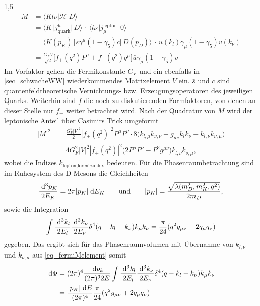 \documentclass[11pt,a4paper,twoside]{report}
\begin{document}
\begin{spacing}{1,5}
\begin{align}
 M &= \big\langle Kl\nu|\mathcal{H}|D\big\rangle\nonumber\\
 &= \big\langle K\, \big|j_\text{quark}^\mu\big|\,D \big\rangle \,\cdot\,\big\langle l\nu\,\big|j_\mu^\text{lepton}\big|\,0\big\rangle\nonumber\\
 &= \big\langle K(p_K)\, \big|\bar s \gamma^\mu(1-\gamma_5) c \big|\,D(p_D) \big\rangle \, \cdot \,\bar u(k_l) \gamma_\mu(1-\gamma_5)v(k_\nu)\nonumber\\
 &=\frac{G_F V}{\sqrt{2}} \big[f_+(q^2) P^\mu  + f_-(q^2) q^\mu\big] \bar u \gamma_\mu(1-\gamma_5)v
 \label{eq_fermiMG_F}
 \end{align}
Im Vorfaktor gehen die Fermikonstante $G_F$ und ein ebenfalls in \ref{sec_schwacheWW} wiederkommendes Matrixelement $V$ ein. $\bar s$ und $c$ sind quantenfeldtheoretische 
Vernichtungs- bzw. Erzeugungsoperatoren des jeweiligen Quarks. Weiterhin sind $f$ die noch zu
diskutierenden Formfaktoren, von denen an dieser Stelle nur $f_+$ weiter betrachtet wird. Nach der Quadratur von $M$ wird der leptonische Anteil über 
Casimirs Trick \cite{Griffiths} umgeformt
\begin{align}
 \big|M\big|^2 &= \frac{G_F^2|V|^2}{2}|f_+(q^2)|^2 P^\mu P^\nu \cdot 8\big(k_{l,\mu} k_{\nu,\nu} - g_{\mu\nu}k_lk_\nu + k_{l,\nu}k_{\nu,\mu}\big)\nonumber\\
 &=4G_F^2|V|^2 |f_+(q^2)|^2 \big(2P^\mu P^\nu - P^2 g^{\mu\nu}\big) k_{l,\nu}k_{\nu,\mu},
 \label{eq_fermiMelement}
\end{align}
wobei die Indizes $k_{\text{lepton},\text{lorentzindex}}$ bedeuten. Für die Phasenraumbetrachtung sind im Ruhesystem des D-Mesons die Gleichheiten
\begin{align}
 \frac{\; \mathrm{d}^3 p_K}{2E_K} = 2\pi |p_K| \; \mathrm{d} E_K \qquad \text{und} \qquad |p_K| = \frac{\sqrt{\lambda(m_D^2,m_K^2,q^2)}}{2m_D},
\end{align}
sowie die Integration
\begin{align}
 \int \frac{\; \mathrm{d}^3k_l}{2E_l}\frac{\; \mathrm{d}^3k_\nu}{2E_\nu}\delta^4(q-k_l-k_\nu)k_\mu k_\nu = \frac{\pi}{24}(q^2 g_{\mu\nu} + 2 q_\mu q_\nu)
\end{align}
gegeben. Das ergibt sich für das Phasenraumvolumen mit Übernahme von $k_{l,\nu}$ und $k_{\nu,\mu}$ aus \eqref{eq_fermiMelement} somit
\begin{align}
 \dx \Phi &= (2\pi)^4 \frac{\dx p_k}{(2\pi)^9 2E} \int \frac{\dx^3k_l}{2E_l}\frac{\dx^3k_\nu}{2E_\nu}\delta^4(q-k_l-k_\nu)k_\mu k_\nu \nonumber\\
 &= \frac{|p_K| \dx E}{(2\pi)^4}\frac{\pi}{24}(q^2g_{\mu\nu} + 2 q_\mu q_\nu)

\end{align}
\end{spacing}
\end{document}
